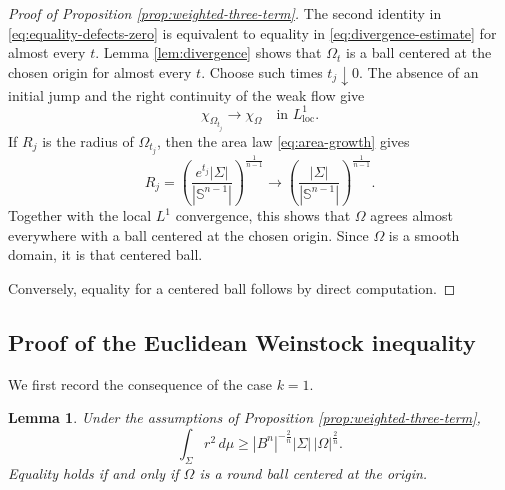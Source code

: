 \documentclass[10pt,a4paper]{amsart}
\numberwithin{equation}{section}
\newtheorem{lemma}[theorem]{Lemma}
\newcommand{\Sn}{\mathbb S}
\newcommand{\Om}{\Omega}
\newcommand{\Sig}{\Sigma}
\begin{document}
\begin{proof}[Proof of Proposition \ref{prop:weighted-three-term}]
The second identity in \eqref{eq:equality-defects-zero} is equivalent to equality in \eqref{eq:divergence-estimate} for almost every $t$.  Lemma \ref{lem:divergence} shows that $\Om_t$ is a ball centered at the chosen origin for almost every $t$.  Choose such times $t_j\downarrow0$.  The absence of an initial jump and the right continuity of the weak flow give
\begin{equation*}
    \chi_{\Om_{t_j}}\longrightarrow\chi_\Om
    \quad\text{in }L^1_{\mathrm{loc}}.
\end{equation*}
If $R_j$ is the radius of $\Om_{t_j}$, then the area law \eqref{eq:area-growth} gives
\begin{equation*}
    R_j
    =\left(\frac{e^{t_j}|\Sig|}{|\Sn^{n-1}|}\right)^{\frac1{n-1}}
    \longrightarrow
    \left(\frac{|\Sig|}{|\Sn^{n-1}|}\right)^{\frac1{n-1}}.
\end{equation*}
Together with the local $L^1$ convergence, this shows that $\Om$ agrees almost everywhere with a ball centered at the chosen origin.  Since $\Om$ is a smooth domain, it is that centered ball.

Conversely, equality for a centered ball follows by direct computation.
\end{proof}

\subsection{Proof of the Euclidean Weinstock inequality}

We first record the consequence of the case $k=1$.

\begin{lemma}\label{lem:moment-lower}
Under the assumptions of Proposition \ref{prop:weighted-three-term},
\begin{equation*}
    \int_\Sig r^2\,d\mu
    \geq
    |B^n|^{-\frac2n}|\Sig|\,|\Om|^{\frac2n}.
\end{equation*}
Equality holds if and only if $\Om$ is a round ball centered at the origin.
\end{lemma}
\end{document}
